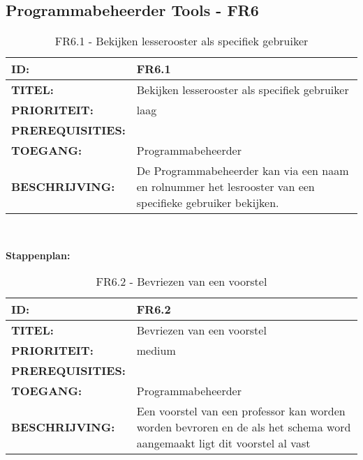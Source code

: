 \subsection{Programmabeheerder Tools - FR6}

\noindent\begin{table}[H]
            \begin{tabular}{l | p{10cm}}
                \textbf{ID:} & FR6.1 \\ \hline
                \textbf{TITEL:} & Bekijken lesserooster als specifiek gebruiker\\ \hline
                \textbf{PRIORITEIT:} &  laag \\ \hline
                \textbf{PREREQUISITIES:} & \\ \hline
                \textbf{TOEGANG:} & Programmabeheerder \\ \hline
                \textbf{BESCHRIJVING:} & De Programmabeheerder kan via een naam en rolnummer het lesrooster van een specifieke gebruiker bekijken. \\ 
            \end{tabular}\\
            \caption{FR6.1 - Bekijken lesserooster als specifiek gebruiker}
            \label{tab:FR6.1 - Bekijken lesserooster als specifiek gebruiker}
        \end{table}
        
\textbf{Stappenplan:}
	\begin{enumerate}
	
	\end{enumerate}
        
\noindent\begin{table}[H]
            \begin{tabular}{l | p{10cm}}
                \textbf{ID:} & FR6.2 \\ \hline
                \textbf{TITEL:} & Bevriezen van een voorstel\\ \hline
                \textbf{PRIORITEIT:} &  medium \\ \hline
                \textbf{PREREQUISITIES:} & \\ \hline
                \textbf{TOEGANG:} & Programmabeheerder \\ \hline
                \textbf{BESCHRIJVING:} & Een voorstel van een professor kan worden worden bevroren en de als het schema word aangemaakt ligt dit voorstel al vast\\ 
            \end{tabular}\\
            \caption{FR6.2 - Bevriezen van een voorstel}
            \label{tab:FR6.2 - Bevriezen van een voorstel}
        \end{table}
        

